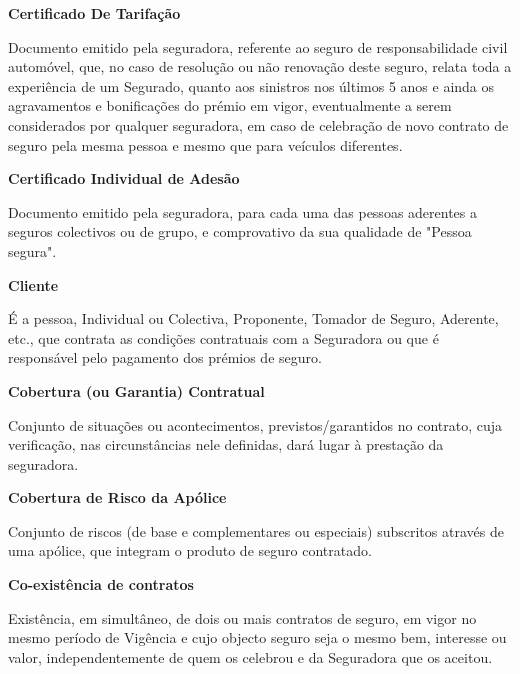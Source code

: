 \begin{description}
\item \textbf{Certificado De Tarifação}

Documento emitido pela seguradora, referente ao seguro de responsabilidade civil automóvel, que, no caso de resolução ou não renovação deste seguro, relata toda a experiência de um Segurado, quanto aos sinistros nos últimos 5 anos e ainda os agravamentos e bonificações do prémio em vigor, eventualmente a serem considerados por qualquer seguradora, em caso de celebração de novo contrato de seguro pela mesma pessoa e mesmo que para veículos diferentes.
\end{description}

\begin{description}
\item \textbf{Certificado Individual de Adesão}

Documento emitido pela seguradora, para cada uma das pessoas aderentes a seguros colectivos ou de grupo, e comprovativo da sua qualidade de "Pessoa segura".
\end{description}

\begin{description}
\item \textbf{Cliente}

É a pessoa, Individual ou Colectiva, Proponente, Tomador de Seguro, Aderente, etc., que contrata as condições contratuais com a Seguradora ou que é responsável pelo pagamento dos prémios de seguro.
\end{description}

\begin{description}
\item \textbf{Cobertura (ou Garantia) Contratual}

Conjunto de situações ou acontecimentos, previstos/garantidos no contrato, cuja verificação, nas circunstâncias nele definidas, dará lugar à prestação da seguradora.
\end{description}

\begin{description}
\item \textbf{Cobertura de Risco da Apólice}

Conjunto de riscos (de base e complementares ou especiais) subscritos através de uma apólice, que integram o produto de seguro contratado.
\end{description}

\begin{description}
\item \textbf{Co-existência de contratos}

Existência, em simultâneo, de dois ou mais contratos de seguro, em vigor no mesmo período de Vigência e cujo objecto seguro seja o mesmo bem, interesse ou valor, independentemente de quem os celebrou e da Seguradora que os aceitou.
\end{description}

